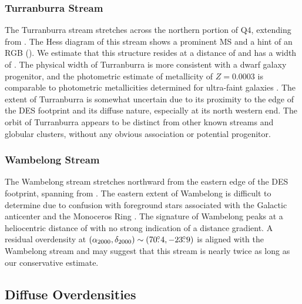 \documentclass[twocolumn]{aastex61}
\begin{document}
\subsubsection{Turranburra Stream}
\label{sec:eridanus}

The Turranburra stream stretches across the northern portion of Q4, extending from .
The Hess diagram of this stream shows a prominent MS and a hint of an RGB ().
We estimate that this structure resides at a distance of \CHECK{$27.5\kpc$} and has a width of \CHECK{$288 \pc$}.
The physical width of Turranburra is more consistent with a dwarf galaxy progenitor, and the photometric estimate of metallicity of $Z = 0.0003$ is comparable to photometric metallicities determined for ultra-faint galaxies \citep[\eg,][]{Bechtol:2015}. 
The extent of Turranburra is somewhat uncertain due to its proximity to the edge of the DES footprint and its diffuse nature, especially at its north western end.
The orbit of Turranburra appears to be distinct from other known streams and globular clusters, without any obvious association or potential progenitor.

\subsubsection{Wambelong Stream}
\label{sec:wambelong}

The Wambelong stream stretches northward from the eastern edge of the DES footprint, spanning \CHECK{$\roughly 14\degrees$} from .
The eastern extent of Wambelong is difficult to determine due to confusion with foreground stars associated with the Galactic anticenter and the Monoceros Ring \citep{Newberg:2002,Yanny:2003}.
The signature of Wambelong peaks at a heliocentric distance of  with no strong indication of a distance gradient.
A residual overdensity at $({\alpha_{2000}},{\delta_{2000}}) \sim (70\mbox{$.\!\!^\circ$}4,-23\mbox{$.\!\!^\circ$}9)$ is aligned with the Wambelong stream and may suggest that this stream is nearly twice as long as our conservative estimate.

\subsection{Diffuse Overdensities}
\label{sec:palca}
\end{document}

